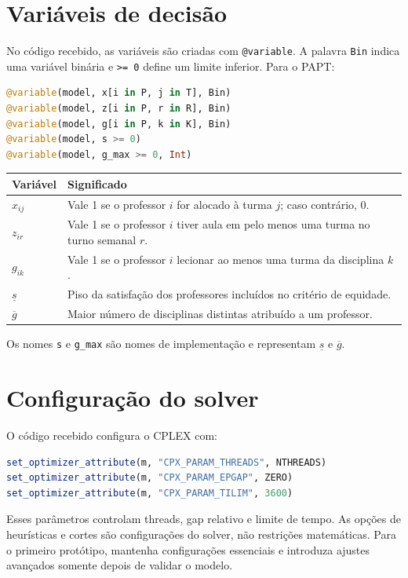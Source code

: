 \documentclass[11pt,a4paper]{article}
\begin{document}
\section{Variáveis de decisão}
No código recebido, as variáveis são criadas com \texttt{@variable}. A palavra \texttt{Bin} indica uma variável binária e \texttt{>= 0} define um limite inferior.
Para o PAPT:
\begin{lstlisting}[language=Julia]
@variable(model, x[i in P, j in T], Bin)
@variable(model, z[i in P, r in R], Bin)
@variable(model, g[i in P, k in K], Bin)
@variable(model, s >= 0)
@variable(model, g_max >= 0, Int)
\end{lstlisting}
\begin{center}
\begin{tabular}{p{}p{}}
\toprule
\textbf{Variável} & \textbf{Significado}\\
\midrule
$x_{ij}$ & Vale 1 se o professor $i$ for alocado à turma $j$; caso contrário, 0.\\
$z_{ir}$ & Vale 1 se o professor $i$ tiver aula em pelo menos uma turma no turno semanal $r$.\\
$g_{ik}$ & Vale 1 se o professor $i$ lecionar ao menos uma turma da disciplina $k$.\\
$\underline{s}$ & Piso da satisfação dos professores incluídos no critério de equidade.\\
$\overline{g}$ & Maior número de disciplinas distintas atribuído a um professor.\\
\bottomrule
\end{tabular}
\end{center}
Os nomes \texttt{s} e \texttt{g\_max} são nomes de implementação e representam $\underline{s}$ e $\overline{g}$.

\section{Configuração do solver}
O código recebido configura o CPLEX com:
\begin{lstlisting}[language=Julia]
set_optimizer_attribute(m, "CPX_PARAM_THREADS", NTHREADS)
set_optimizer_attribute(m, "CPX_PARAM_EPGAP", ZERO)
set_optimizer_attribute(m, "CPX_PARAM_TILIM", 3600)
\end{lstlisting}
Esses parâmetros controlam threads, gap relativo e limite de tempo. As opções de heurísticas e cortes são configurações do solver, não restrições matemáticas.
Para o primeiro protótipo, mantenha configurações essenciais e introduza ajustes avançados somente depois de validar o modelo.
\end{document}
